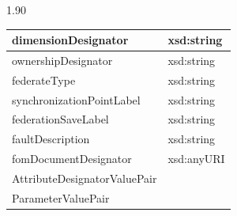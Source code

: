 {\begin{cxiitabletypeset}[7.80]{1.90}
{\begin{tabular}{|Y{220pt}|Y{300pt}|}
        dimensionDesignator & xsd:string \\ \hline
        ownershipDesignator & xsd:string \\ \hline
        federateType & xsd:string \\ \hline
        synchronizationPointLabel & xsd:string \\ \hline
        federationSaveLabel & xsd:string \\ \hline
        faultDescription & xsd:string \\ \hline
        fomDocumentDesignator & xsd:anyURI \\ \hline
        AttributeDesignatorValuePair &  \\ \hline
        ParameterValuePair &  \\ \hline
        \end{tabular}%
    }
    \end{cxiitabletypeset}%
}

